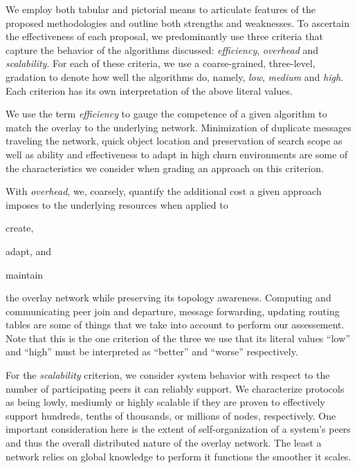We employ both tabular and pictorial means to 
articulate features of the proposed methodologies and outline
both strengths and weaknesses.
To ascertain the effectiveness of each proposal, we predominantly use 
three criteria that capture the behavior of the algorithms 
discussed:
\emph{efficiency}, \emph{overhead} and \emph{scalability}.
For each of these criteria, we use a coarse-grained,
three-level, gradation to denote how well the algorithms do,
namely, \emph{low}, \emph{medium} and \emph{high}.
Each criterion has its own
interpretation of the above literal values.

We use the term \emph{efficiency} to gauge the competence of a given
algorithm to match the overlay to the underlying network. Minimization
of duplicate messages traveling the network, quick object location and
preservation of search scope as well as ability and
effectiveness to adapt in high churn environments are some of the
characteristics we consider when grading an approach on this criterion.

With \emph{overhead}, we, coarsely, quantify the additional cost a given approach
imposes to the underlying resources when applied to
\begin{inparaenum}
  \item create,
  \item adapt, and
  \item maintain
\end{inparaenum}
the overlay network while preserving its topology awareness. Computing and
communicating peer join and departure, message forwarding, updating routing tables
are some of things that we take into account to perform our assessement. Note
that this is the one criterion of the three we use that its literal values
``low'' and ``high'' must be interpreted as ``better'' and ``worse'' respectively.

For the \emph{scalability} criterion, we consider system behavior with respect
to the number of participating peers it can reliably support. We characterize
protocols as being lowly, mediumly or highly scalable if they are proven to
effectively support hundreds, tenths of thousands, or millions of nodes,
respectively. One important consideration here is the extent of self-organization
of a system's peers and thus the overall distributed nature of the overlay network.
The least a network relies on global knowledge to perform it functions the smoother
it scales.
